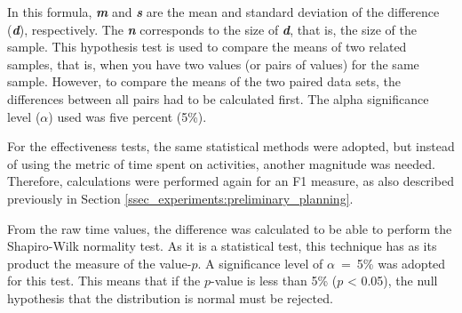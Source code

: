 In this formula, \textit{\textbf{m}} and \textit{\textbf{s}} are the mean and standard deviation of the difference (\textbf{\textit{d}}), respectively.
The \textit{\textbf{n}} corresponds to the size of \textit{\textbf{d}}, that is, the size of the sample.
This hypothesis test is used to compare the means of two related samples, that is, when you have two values (or pairs of values) for the same sample.
However, to compare the means of the two paired data sets, the differences between all pairs had to be calculated first.
The alpha significance level ($\alpha$) used was five percent (5\%).

For the effectiveness tests, the same statistical methods were adopted, but instead of using the metric of time spent on activities, another magnitude was needed.
Therefore, calculations were performed again for an F1 measure, as also described previously in Section \ref{ssec_experiments:preliminary_planning}.


From the raw time values, the difference was calculated to be able to perform the Shapiro-Wilk normality test.
As it is a statistical test, this technique has as its product the measure of the value-$p$.
A significance level of $\alpha$~=~5\% was adopted for this test.
This means that if the $p$-value is less than 5\% ($p$ < 0.05), the null hypothesis that the distribution is normal must be rejected.

